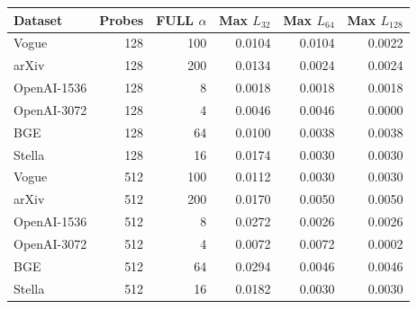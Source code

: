 \begin{tabular}{@{}lrrrrr@{}}
\toprule
Dataset & Probes & FULL $\alpha$ & Max $L_{32}$ & Max $L_{64}$ & Max $L_{128}$ \\
\midrule
Vogue & 128 & 100 & 0.0104 & 0.0104 & 0.0022 \\
arXiv & 128 & 200 & 0.0134 & 0.0024 & 0.0024 \\
OpenAI-1536 & 128 & 8 & 0.0018 & 0.0018 & 0.0018 \\
OpenAI-3072 & 128 & 4 & 0.0046 & 0.0046 & 0.0000 \\
BGE & 128 & 64 & 0.0100 & 0.0038 & 0.0038 \\
Stella & 128 & 16 & 0.0174 & 0.0030 & 0.0030 \\
Vogue & 512 & 100 & 0.0112 & 0.0030 & 0.0030 \\
arXiv & 512 & 200 & 0.0170 & 0.0050 & 0.0050 \\
OpenAI-1536 & 512 & 8 & 0.0272 & 0.0026 & 0.0026 \\
OpenAI-3072 & 512 & 4 & 0.0072 & 0.0072 & 0.0002 \\
BGE & 512 & 64 & 0.0294 & 0.0046 & 0.0046 \\
Stella & 512 & 16 & 0.0182 & 0.0030 & 0.0030 \\
\bottomrule
\end{tabular}
